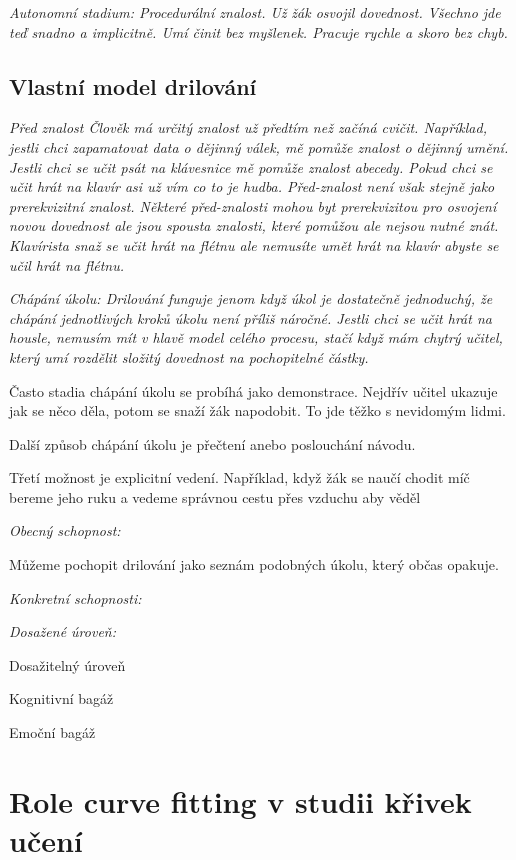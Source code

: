 \em Autonomní stadium\em : Procedurální znalost.  Už žák osvojil dovednost. Všechno jde teď snadno a implicitně.  Umí činit bez myšlenek. Pracuje rychle a skoro bez chyb\citep{o1987some}.

\subsection{Vlastní model drilování}

\em Před znalost \em Člověk má určitý znalost už předtím než začíná cvičit. Například, jestli chci zapamatovat data o dějinný válek, mě pomůže znalost o dějinný umění.  Jestli chci se učit psát na klávesnice mě pomůže znalost abecedy. Pokud chci se učit hrát na klavír asi už vím co to je hudba.  Před-znalost není však stejně jako prerekvizitní znalost.  Některé před-znalosti mohou byt prerekvizitou pro osvojení novou dovednost ale jsou spousta znalosti, které pomůžou ale nejsou nutné znát.  Klavírista snaž se učit hrát na flétnu ale nemusíte umět hrát na klavír abyste se učil hrát na flétnu.

\em Chápání úkolu\em : Drilování funguje jenom když úkol je dostatečně jednoduchý, že chápání jednotlivých kroků úkolu není příliš náročné.  Jestli chci se učit hrát na housle, nemusím mít v hlavě model celého procesu, stačí když mám chytrý učitel, který umí rozdělit složitý dovednost na pochopitelné částky.

Často stadia chápání úkolu se probíhá jako demonstrace.  Nejdřív učitel ukazuje jak se něco děla, potom se snaží žák napodobit.  To jde těžko s nevidomým lidmi.

Další způsob chápání úkolu je přečtení anebo poslouchání návodu.

Třetí možnost je explicitní vedení.  Například, když žák se naučí chodit míč bereme jeho ruku a vedeme správnou cestu přes vzduchu aby věděl 

\em Obecný schopnost\em :

Můžeme pochopit drilování jako seznám podobných úkolu, který občas opakuje.

\em Konkretní schopnosti\em :

\em Dosažené úroveň\em :

Dosažitelný úroveň

Kognitivní bagáž

Emoční bagáž

\section{Role curve fitting v studii křivek učení}

